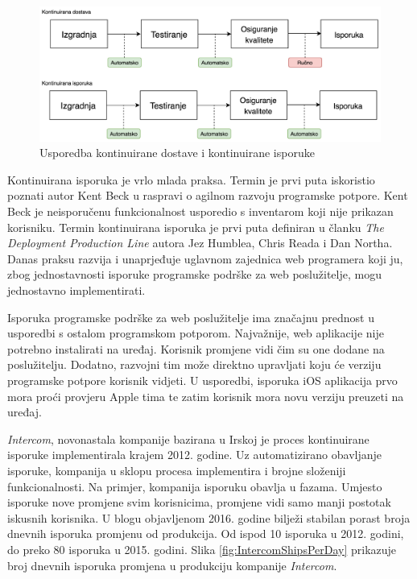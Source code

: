 \documentclass[times, utf8, diplomski, numeric]{fer}
\begin{document}
\begin{figure}
\centering
\includegraphics[scale=0.55]{CDDifferences}
\caption{Usporedba kontinuirane dostave i kontinuirane isporuke}
\label{fig:CDDifferences}
\end{figure}

Kontinuirana isporuka je vrlo mlada praksa. Termin je prvi puta iskoristio poznati autor Kent Beck u raspravi o agilnom razvoju programske potpore. Kent Beck je neisporučenu funkcionalnost usporedio s inventarom koji nije prikazan korisniku. Termin kontinuirana isporuka je prvi puta definiran u članku \textit{The Deployment Production Line} autora Jez Humblea, Chris Reada i Dan Northa\citep{mics:DPT}. Danas praksu razvija i unaprjeđuje uglavnom zajednica web programera koji ju, zbog jednostavnosti isporuke programske podrške za web poslužitelje, mogu jednostavno implementirati.

Isporuka programske podrške za web poslužitelje ima značajnu prednost u usporedbi s ostalom programskom potporom. Najvažnije, web aplikacije nije potrebno instalirati na uređaj. Korisnik promjene vidi čim su one dodane na poslužitelju. Dodatno, razvojni tim može direktno upravljati koju će verziju programske potpore korisnik vidjeti. U usporedbi, isporuka iOS aplikacija prvo mora proći provjeru Apple tima te zatim korisnik mora novu verziju preuzeti na uređaj.

\textit{Intercom}, novonastala kompanije bazirana u Irskoj je proces kontinuirane isporuke implementirala krajem 2012. godine. Uz automatizirano obavljanje isporuke, kompanija u sklopu procesa implementira i brojne složeniji funkcionalnosti. Na primjer, kompanija isporuku obavlja u fazama. Umjesto isporuke nove promjene svim korisnicima, promjene vidi samo manji postotak iskusnih korisnika. U blogu objavljenom 2016. godine bilježi stabilan porast broja dnevnih isporuka promjenu od produkcija. Od ispod 10 isporuka u 2012. godini, do preko 80 isporuka u 2015. godini. Slika \ref{fig:IntercomShipsPerDay} prikazuje broj dnevnih isporuka promjena u produkciju kompanije \textit{Intercom}\citep{intercom:cd}.
\end{document}
